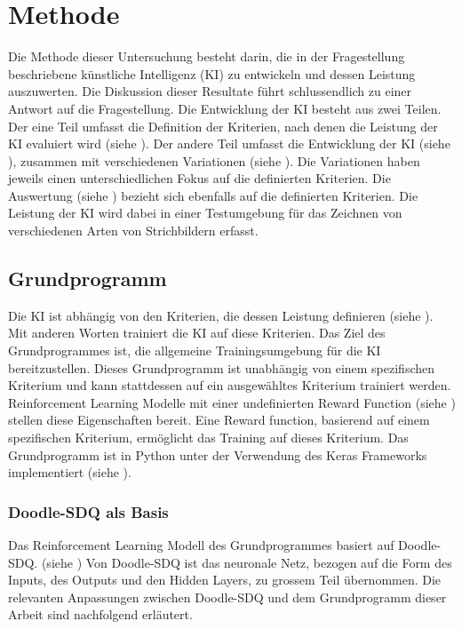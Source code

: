 \chapter{Methode}
\label{chap:m}
Die Methode dieser Untersuchung besteht darin, die in der Fragestellung
beschriebene künstliche Intelligenz (KI) zu entwickeln und dessen Leistung
auszuwerten. Die Diskussion dieser Resultate führt schlussendlich zu einer
Antwort auf die Fragestellung. Die Entwicklung der KI besteht aus zwei Teilen.
Der eine Teil umfasst die Definition der Kriterien, nach denen die Leistung der
KI evaluiert wird (siehe ). Der andere Teil umfasst die
Entwicklung der KI (siehe ), zusammen mit verschiedenen
Variationen (siehe ). Die Variationen haben jeweils einen
unterschiedlichen Fokus auf die definierten Kriterien. Die Auswertung (siehe
) bezieht sich ebenfalls auf die definierten Kriterien.
Die Leistung der KI wird dabei in einer Testumgebung für das Zeichnen von
verschiedenen Arten von Strichbildern erfasst.

\section{Grundprogramm}
\label{chap:m_grund}
Die KI ist abhängig von den Kriterien, die dessen Leistung definieren (siehe
). Mit anderen Worten trainiert die KI auf diese Kriterien.
Das Ziel des Grundprogrammes ist, die allgemeine Trainingsumgebung für die KI
bereitzustellen. Dieses Grundprogramm ist unabhängig von einem spezifischen
Kriterium und kann stattdessen auf ein ausgewähltes Kriterium trainiert werden.
Reinforcement Learning Modelle mit einer undefinierten Reward Function (siehe
\nameref{\label{sub:t_rl_func}}) stellen diese Eigenschaften bereit. Eine Reward
function, basierend auf einem spezifischen Kriterium, ermöglicht das Training
auf dieses Kriterium. Das Grundprogramm ist in Python unter der Verwendung des
Keras Frameworks implementiert (siehe ). 

\subsection{Doodle-SDQ als Basis}
\label{sub:m_grund_dood}
Das Reinforcement Learning Modell des Grundprogrammes basiert auf Doodle-SDQ.
(siehe ) Von Doodle-SDQ ist das neuronale Netz, bezogen
auf die Form des Inputs, des Outputs und den Hidden Layers, zu grossem Teil
übernommen. Die relevanten Anpassungen zwischen Doodle-SDQ und dem Grundprogramm
dieser Arbeit sind nachfolgend erläutert.

